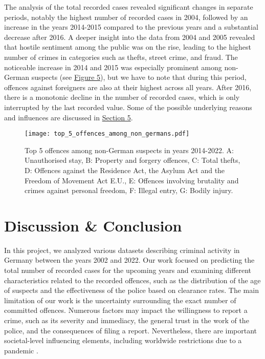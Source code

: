\documentclass{article}
\theoremstyle{plain}
\theoremstyle{definition}
\theoremstyle{remark}
\begin{document}
The analysis of the total recorded cases revealed significant changes in separate periods, notably the highest number of recorded cases in 2004, followed by an increase in the years 2014-2015 compared to the previous years and a substantial decrease after 2016. A deeper insight into the data from 2004 and 2005 revealed that hostile sentiment among the public was on the rise, leading to the highest number of crimes in categories such as thefts, street crime, and fraud. The noticeable increase in 2014 and 2015 was especially prominent among non-German suspects (see \hyperref[fig:non-german]{Figure 5}), but we have to note that during this period, offences against foreigners are also at their highest across all years. After 2016, there is a monotonic decline in the number of recorded cases, which is only interrupted by the last recorded value. Some of the possible underlying reasons and influences are discussed in \hyperref[sec:conclusion]{Section 5}.

\begin{figure}[h!]
    \texttt{[image: top\_5\_offences\_among\_non\_germans.pdf]}
    \caption{Top 5 offences among non-German suspects in years 2014-2022. A: Unauthorised stay, B: Property and forgery offences, C: Total thefts, D: Offences against the Residence Act, the Asylum Act and the Freedom of Movement Act E.U., E: Offences involving brutality and crimes against personal freedom, F: Illegal entry, G: Bodily injury.}
    \label{fig:non-german}
\end{figure}


\section{Discussion \& Conclusion}\label{sec:conclusion}

In this project, we analyzed various datasets describing criminal activity in Germany between the years 2002 and 2022. Our work focused on predicting the total number of recorded cases for the upcoming years and examining different characteristics related to the recorded offences, such as the distribution of the age of suspects and the effectiveness of the police based on clearance rates. The main limitation of our work is the uncertainty surrounding the exact number of committed offences. Numerous factors may impact the willingness to report a crime, such as its severity and immediacy, the general trust in the work of the police, and the consequences of filing a report. Nevertheless, there are important societal-level influencing elements, including worldwide restrictions due to a pandemic \cite{covid_influence}. 
\end{document}
